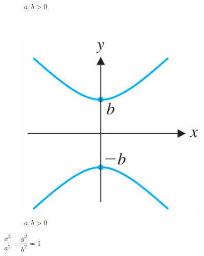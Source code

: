 \begin{frame}[c]
\begin{columns}[c]
\begin{column}{0.45\textwidth}
\begin{figure}
\begin{subfigure}[b]{0.4\textwidth}
					\caption{$a, b>0$}
				\end{subfigure}
				\qquad 
				~ %
				\begin{subfigure}[b]{0.4\textwidth}
					\includegraphics[width=1.4\textwidth]{imagenes/hiperbola2}
					\caption{$a, b>0$}
				\end{subfigure}
				\vspace{3mm}
				\caption{$\dfrac{x^2}{a^2}-\dfrac{y^2}{b^2}=1$}
			\end{figure}	
		\end{column}
	\end{columns}	
\end{frame}



\subsection{}

